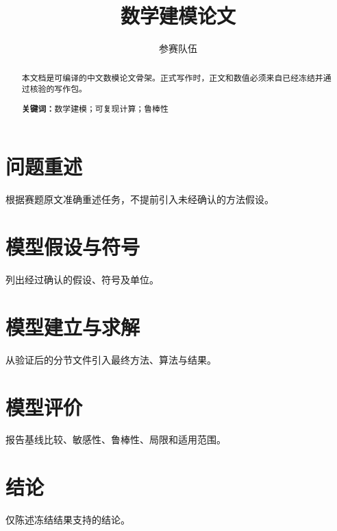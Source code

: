 \documentclass[12pt,a4paper]{ctexart}
\title{数学建模论文}
\author{参赛队伍}
\date{}
\begin{document}
\maketitle

\begin{abstract}
本文档是可编译的中文数模论文骨架。正式写作时，正文和数值必须来自已经冻结并通过核验的写作包。

\textbf{关键词：}数学建模；可复现计算；鲁棒性
\end{abstract}

\section{问题重述}
根据赛题原文准确重述任务，不提前引入未经确认的方法假设。

\section{模型假设与符号}
列出经过确认的假设、符号及单位。

\section{模型建立与求解}
从验证后的分节文件引入最终方法、算法与结果。

\section{模型评价}
报告基线比较、敏感性、鲁棒性、局限和适用范围。

\section{结论}
仅陈述冻结结果支持的结论。
\end{document}
